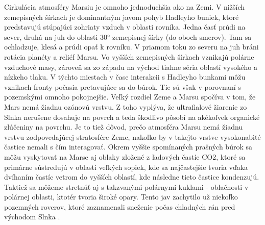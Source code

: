 Cirkulácia atmosféry Marsiu je omnoho jednoduchšia ako na Zemi. V nižších zemepisných šírkach je dominantným javom pohyb Hadleyho buniek, ktoré predstavujú stúpajúci zohriaty vzduch v oblasti rovníka. Jedna časť prúdi na sever, druhá na juh do oblasti 30° zemepisnej šírky (do oboch smerov). Tam sa ochladzuje, klesá a prúdi opať k rovníku. V priamom toku zo severu na juh bráni rotácia planéty a reliéf Marsu. Vo vyšších zemepisných šírkach vznikajú polárne vzduchové masy, zároveň sa zo západu na východ tiahne séria oblastí vysokého a nízkeho tlaku. V týchto miestach v čase interakcii s Hadleyho bunkami môžu vznikach fronty počasia pretavujúce sa do búrok. Tie sú však v porovnaní s pozemskými omnoho pokojnejšie.
Veľký rozdiel Zeme a Marsu spočíva v tom, že Mars nemá žiadnu ozónovú vrstvu. Z toho vyplýva, že ultrafialové žiarenie zo Slnka nerušene dosahuje na povrch a teda škodlivo pôsobí na akékoľvek organické zlúčeniny na povrchu. Je to tiež dôvod, prečo atmosféra Marsu nemá žiadnu vrstvu zodpovedajúcej stratosfére Zeme, nakoľko by v takejto vrstve vysokonabité častice nemali s čím interagovať. 
Okrem vyššie spomínaných prašných búrok sa môžu vyskytovať na Marse aj oblaky zložené z ľadových častíc CO2, ktoré sa primárne sústreďujú v oblasti veľkých sopiek, kde sa najčastejšie tvoria vďaka dvíhaním častíc vetrom do vyšších oblastí, kde následne tieto častice kondenzujú. Taktiež sa môžeme stretnúť aj s takzvanými polárnymi kuklami - oblačnosti v polárnej oblasti, ktotér tvoria široké opary. Tento jav zachytilo už niekoľko pozemných roverov, ktoré zaznamenali sneženie počas chladných rán pred východom Slnka \cite{pocasie_mars}. 

